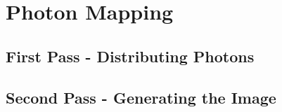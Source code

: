 \chapter{Photon Mapping}


\section{First Pass - Distributing Photons}



\section{Second Pass - Generating the Image}

